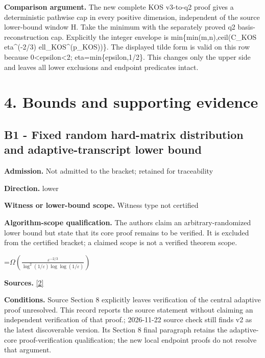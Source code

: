 \documentclass[10pt,a4paper]{article}
\newcommand{\AtlasMath}[1]{\par\begingroup\centering\setbox0=\hbox{$\displaystyle #1$}\ifdim\wd0>1.4\linewidth\typeout{ATLAS WIDE FORMULA: \the\wd0}\fi\ifdim\wd0>\linewidth\resizebox{\linewidth}{!}{\box0}\else\box0\fi\par\endgroup}
\begin{document}
\textbf{Comparison argument.} The new complete KOS v3-to-q2 proof gives a deterministic pathwise cap in every positive dimension, independent of the source lower-bound window H. Take the minimum with the separately proved q2 basis-reconstruction cap. Explicitly the integer envelope is min\{min(m,n),ceil(C\_KOS eta\textasciicircum{}(-2/3) ell\_KOS\textasciicircum{}(p\_KOS))\}. The displayed tilde form is valid on this row because 0<epsilon<2; eta=min\{epsilon,1/2\}. This changes only the upper side and leaves all lower exclusions and endpoint predicates intact.



\section{4. Bounds and supporting evidence}


\subsection{B1 - Fixed random hard-matrix distribution and adaptive-transcript lower bound}


\textbf{Admission.} Not admitted to the bracket; retained for traceability



\textbf{Direction.} lower



\textbf{Witness or lower-bound scope.} Witness type not certified



\textbf{Algorithm-scope qualification.} The authors claim an arbitrary-randomized lower bound but state that its core proof remains to be verified. It is excluded from the certified bracket; a claimed scope is not a verified theorem scope.



\AtlasMath{\Omega\!\left(\frac{\varepsilon^{-2/3}}{\log^{2}(1/\varepsilon)\log\log(1/\varepsilon)}\right)}


\textbf{Sources.} \href{https://arxiv.org/pdf/2610.02095v2}{[2]}



\textbf{Conditions.} Source Section 8 explicitly leaves verification of the central adaptive proof unresolved. This record reports the source statement without claiming an independent verification of that proof.; 2026-11-22 source check still finds v2 as the latest discoverable version. Its Section 8 final paragraph retains the adaptive-core proof-verification qualification; the new local endpoint proofs do not resolve that argument.
\end{document}
